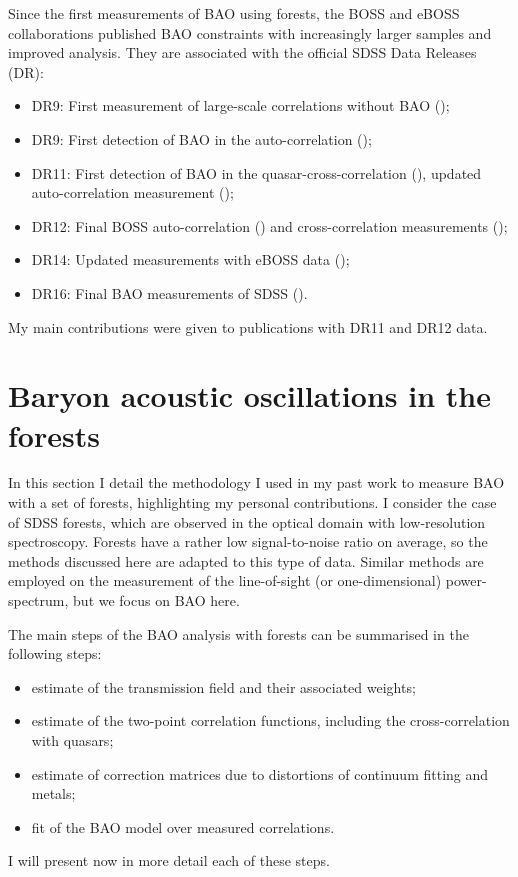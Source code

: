Since the first measurements of BAO using forests, the BOSS and eBOSS collaborations 
published BAO constraints with increasingly larger samples and improved analysis.
They are associated with the official SDSS Data Releases (DR):
\begin{itemize}
 \item DR9: First measurement of large-scale \lya correlations without BAO (\cite{slosarLymanAlphaForest2011}); 
 \item DR9: First detection of BAO in the \lya auto-correlation 
            (\cite{buscaBaryonAcousticOscillations2013, slosarMeasurementBaryonAcoustic2013, kirkbyFittingMethodsBaryon2013});
 \item DR11: First detection of BAO in the quasar-\lya cross-correlation (\cite{font-riberaQuasarLymanalphaForestCrosscorrelation2014}), 
             updated auto-correlation measurement (\cite{delubacBaryonAcousticOscillations2015});
 \item DR12: Final BOSS auto-correlation (\cite{bautistaMeasurementBaryonAcoustic2017}) 
             and cross-correlation measurements (\cite{dumasdesbourbouxBaryonAcousticOscillations2017});
 \item DR14: Updated measurements with eBOSS data (\cite{desainteagatheBaryonAcousticOscillations2019, blomqvistBaryonAcousticOscillations2019});
 \item DR16: Final \lya BAO measurements of SDSS (\cite{dumasdesbourbouxhelionCompletedSDSSIVExtended2020}).
\end{itemize}

My main contributions were given to publications with DR11 and DR12 data. 

\section{Baryon acoustic oscillations in the forests}
\label{forests:bao}

In this section I detail the methodology I used in my past work 
to measure BAO with a set of \lya forests, highlighting my 
personal contributions. I consider the case of SDSS forests, 
which are observed in the optical domain with low-resolution spectroscopy.
Forests have a rather low signal-to-noise ratio on average, 
so the methods discussed here are adapted to this type of data. 
Similar methods are employed on the measurement of the line-of-sight
(or one-dimensional) power-spectrum, but we focus on BAO here. 

The main steps of the BAO analysis with \lya forests can be summarised in the following steps:
\begin{itemize}
    \item estimate of the transmission field and their associated weights;
    \item estimate of the two-point correlation functions, including the cross-correlation with quasars;
    \item estimate of correction matrices due to distortions of continuum fitting and metals; 
    \item fit of the BAO model over measured correlations.
\end{itemize}
I will present now in more detail each of these steps. 

